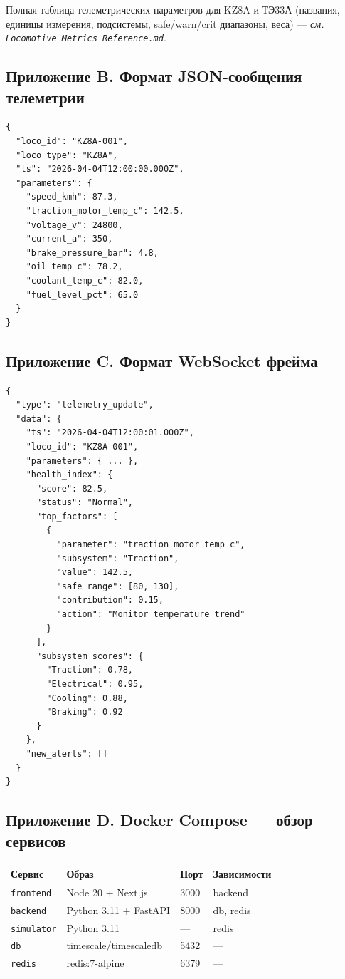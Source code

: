 \documentclass[12pt,a4paper]{article}
\newcommand{\code}[1]{\texttt{#1}}
\begin{document}
Полная таблица телеметрических параметров для KZ8A и ТЭ33А (названия, единицы измерения, подсистемы, safe/warn/crit диапазоны, веса) --- \textit{см.\,\code{Locomotive\_Metrics\_Reference.md}}.

\subsection*{Приложение B. Формат JSON-сообщения телеметрии}

\begin{lstlisting}
{
  "loco_id": "KZ8A-001",
  "loco_type": "KZ8A",
  "ts": "2026-04-04T12:00:00.000Z",
  "parameters": {
    "speed_kmh": 87.3,
    "traction_motor_temp_c": 142.5,
    "voltage_v": 24800,
    "current_a": 350,
    "brake_pressure_bar": 4.8,
    "oil_temp_c": 78.2,
    "coolant_temp_c": 82.0,
    "fuel_level_pct": 65.0
  }
}
\end{lstlisting}

\subsection*{Приложение C. Формат WebSocket фрейма}

\begin{lstlisting}
{
  "type": "telemetry_update",
  "data": {
    "ts": "2026-04-04T12:00:01.000Z",
    "loco_id": "KZ8A-001",
    "parameters": { ... },
    "health_index": {
      "score": 82.5,
      "status": "Normal",
      "top_factors": [
        {
          "parameter": "traction_motor_temp_c",
          "subsystem": "Traction",
          "value": 142.5,
          "safe_range": [80, 130],
          "contribution": 0.15,
          "action": "Monitor temperature trend"
        }
      ],
      "subsystem_scores": {
        "Traction": 0.78,
        "Electrical": 0.95,
        "Cooling": 0.88,
        "Braking": 0.92
      }
    },
    "new_alerts": []
  }
}
\end{lstlisting}

\subsection*{Приложение D. Docker Compose --- обзор сервисов}

\begin{tabularx}{\textwidth}{l l l X}
\toprule
\textbf{Сервис} & \textbf{Образ} & \textbf{Порт} & \textbf{Зависимости} \\
\midrule
\code{frontend} & Node 20 + Next.js & 3000 & backend \\
\code{backend} & Python 3.11 + FastAPI & 8000 & db, redis \\
\code{simulator} & Python 3.11 & --- & redis \\
\code{db} & timescale/timescaledb & 5432 & --- \\
\code{redis} & redis:7-alpine & 6379 & --- \\
\bottomrule
\end{tabularx}
\end{document}
